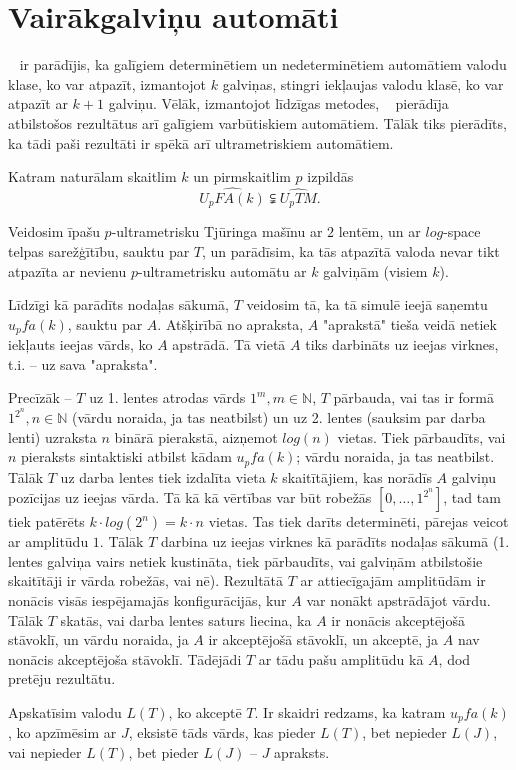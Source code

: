 \documentclass{ludis}
\begin{document}

\section{Vairākgalviņu automāti}
~\citet{Monien1980} ir parādījis, ka galīgiem determinētiem un nedeterminētiem automātiem valodu klase, ko var atpazīt, izmantojot $k$ galviņas, stingri iekļaujas valodu klasē, ko var atpazīt ar $k+1$ galviņu. Vēlāk, izmantojot līdzīgas metodes, ~\citet{Macarie1995} pierādīja atbilstošos rezultātus arī galīgiem varbūtiskiem automātiem. Tālāk tiks pierādīts, ka tādi paši rezultāti ir spēkā arī ultrametriskiem automātiem.

\begin{teorema} \label{atdalisana}
Katram naturālam skaitlim $k$ un pirmskaitlim $p$ izpildās
\[
	\widehat{U_pFA(k)} \subsetneqq \widehat{U_pTM}.
\]
\end{teorema}
\begin{pieradijums}
Veidosim īpašu $p$-ultrametrisku Tjūringa mašīnu ar $2$ lentēm, un ar $log$-space telpas sarežģītību, sauktu par $T$, un parādīsim, ka tās atpazītā valoda nevar tikt atpazīta ar nevienu $p$-ultrametrisku automātu ar $k$ galviņām (visiem $k$).

Līdzīgi kā parādīts nodaļas sākumā, $T$ veidosim tā, ka tā simulē ieejā saņemtu $u_pfa(k)$, sauktu par $A$. Atšķirībā no apraksta, $A$ "aprakstā" tieša veidā netiek iekļauts ieejas vārds, ko $A$ apstrādā. Tā vietā $A$ tiks darbināts uz ieejas virknes, t.i. -- uz sava "apraksta".

Precīzāk -- $T$ uz 1. lentes atrodas vārds $1^m, m \in \mathbb{N}$, $T$ pārbauda, vai tas ir formā $1^{2^n}, n \in \mathbb{N}$ (vārdu noraida, ja tas neatbilst) un uz 2. lentes (sauksim par darba lenti) uzraksta $n$ binārā pierakstā, aizņemot $log(n)$ vietas. Tiek pārbaudīts, vai $n$ pieraksts sintaktiski atbilst kādam $u_pfa(k)$; vārdu noraida, ja tas neatbilst. Tālāk $T$ uz darba lentes tiek izdalīta vieta $k$ skaitītājiem, kas norādīs $A$ galviņu pozīcijas uz ieejas vārda. Tā kā kā vērtības var būt robežās $\left[0, \ldots, 1^{2^n} \right]$, tad tam tiek patērēts $k \cdot log(2^n)= k \cdot n$ vietas. %
Tas tiek darīts determinēti, pārejas veicot ar amplitūdu $1$. Tālāk $T$ darbina uz ieejas virknes kā parādīts nodaļas sākumā (1. lentes galviņa vairs netiek kustināta, tiek pārbaudīts, vai galviņām atbilstošie skaitītāji ir vārda robežās, vai nē). Rezultātā $T$ ar attiecīgajām amplitūdām ir nonācis visās iespējamajās konfigurācijās, kur $A$ var nonākt apstrādājot vārdu. Tālāk $T$ skatās, vai darba lentes saturs liecina, ka $A$ ir nonācis akceptējošā stāvoklī, un vārdu noraida, ja $A$ ir akceptējošā stāvoklī, un akceptē, ja $A$ nav nonācis akceptējoša stāvoklī. Tādējādi $T$ ar tādu pašu amplitūdu kā $A$, dod pretēju rezultātu.

Apskatīsim valodu $L(T)$, ko akceptē $T$. Ir skaidri redzams, ka katram $u_pfa(k)$, ko apzīmēsim ar $J$, eksistē tāds vārds, kas pieder $L(T)$, bet nepieder $L(J)$, vai nepieder $L(T)$, bet pieder $L(J)$ -- $J$ apraksts.
\end{pieradijums}
\end{document}
